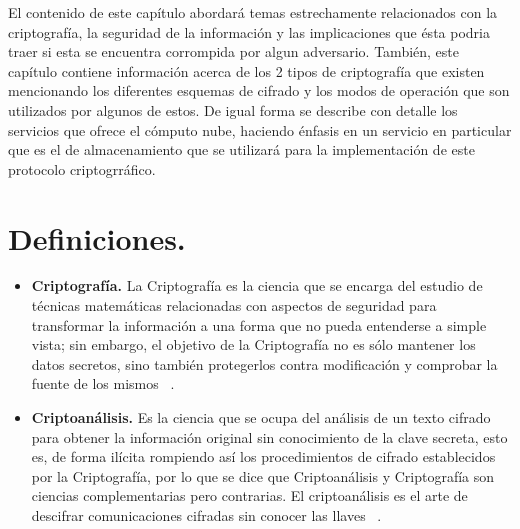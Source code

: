 
El contenido de este capítulo abordará temas estrechamente relacionados con la criptografía, la seguridad de la información y las implicaciones que ésta podria traer si esta se encuentra corrompida por algun adversario. También, este capítulo contiene información acerca de los 2 tipos de criptografía que existen mencionando los diferentes esquemas de cifrado y los modos de operación que son utilizados por algunos de estos. De igual forma se describe con detalle los servicios que ofrece el cómputo nube, haciendo énfasis en un servicio en particular que es el de almacenamiento que se utilizará para la implementación de este protocolo criptogrráfico. 

\section{Definiciones. }
 \begin{itemize}

	\item \textbf{Criptografía. }
	 	La Criptografía es la ciencia que se encarga del estudio de técnicas matemáticas relacionadas con aspectos de seguridad  para transformar la información a una forma que no pueda entenderse a simple vista; sin embargo, el objetivo de la Criptografía no es sólo 	mantener los datos secretos, sino también protegerlos contra modificación y comprobar la fuente de los mismos ~\cite{menezes}.
	\item \textbf{Criptoanálisis. }
		Es la ciencia que se ocupa del análisis de un texto cifrado para obtener la información original sin conocimiento de la clave secreta, esto es, de forma ilícita rompiendo así los procedimientos de cifrado establecidos por la Criptografía, por lo que se dice que 		Criptoanálisis y Criptografía son ciencias complementarias pero contrarias. El criptoanálisis es el arte de descifrar comunicaciones cifradas sin conocer las llaves  ~\cite{cripto}.
 \end{itemize}

